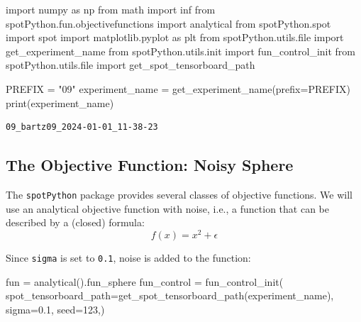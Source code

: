 \documentclass[
  letterpaper,
  DIV=11,
  numbers=noendperiod]{scrreprt}
\newenvironment{Shaded}{\begin{snugshade}}{\end{snugshade}}
\newcommand{\BuiltInTok}[1]{\textcolor[rgb]{0.00,0.23,0.31}{#1}}
\newcommand{\DecValTok}[1]{\textcolor[rgb]{0.68,0.00,0.00}{#1}}
\newcommand{\FloatTok}[1]{\textcolor[rgb]{0.68,0.00,0.00}{#1}}
\newcommand{\ImportTok}[1]{\textcolor[rgb]{0.00,0.46,0.62}{#1}}
\newcommand{\NormalTok}[1]{\textcolor[rgb]{0.00,0.23,0.31}{#1}}
\newcommand{\OperatorTok}[1]{\textcolor[rgb]{0.37,0.37,0.37}{#1}}
\newcommand{\StringTok}[1]{\textcolor[rgb]{0.13,0.47,0.30}{#1}}
\begin{document}
\begin{Shaded}
\begin{Highlighting}[]
\ImportTok{import}\NormalTok{ numpy }\ImportTok{as}\NormalTok{ np}
\ImportTok{from}\NormalTok{ math }\ImportTok{import}\NormalTok{ inf}
\ImportTok{from}\NormalTok{ spotPython.fun.objectivefunctions }\ImportTok{import}\NormalTok{ analytical}
\ImportTok{from}\NormalTok{ spotPython.spot }\ImportTok{import}\NormalTok{ spot}
\ImportTok{import}\NormalTok{ matplotlib.pyplot }\ImportTok{as}\NormalTok{ plt}
\ImportTok{from}\NormalTok{ spotPython.utils.}\BuiltInTok{file} \ImportTok{import}\NormalTok{ get\_experiment\_name}
\ImportTok{from}\NormalTok{ spotPython.utils.init }\ImportTok{import}\NormalTok{ fun\_control\_init}
\ImportTok{from}\NormalTok{ spotPython.utils.}\BuiltInTok{file} \ImportTok{import}\NormalTok{ get\_spot\_tensorboard\_path}

\NormalTok{PREFIX }\OperatorTok{=} \StringTok{"09"}
\NormalTok{experiment\_name }\OperatorTok{=}\NormalTok{ get\_experiment\_name(prefix}\OperatorTok{=}\NormalTok{PREFIX)}
\BuiltInTok{print}\NormalTok{(experiment\_name)}
\end{Highlighting}
\end{Shaded}

\begin{verbatim}
09_bartz09_2024-01-01_11-38-23
\end{verbatim}

\hypertarget{the-objective-function-noisy-sphere-1}{%
\subsection{The Objective Function: Noisy
Sphere}\label{the-objective-function-noisy-sphere-1}}

The \texttt{spotPython} package provides several classes of objective
functions. We will use an analytical objective function with noise,
i.e., a function that can be described by a (closed) formula:
\[f(x) = x^2 + \epsilon\]

Since \texttt{sigma} is set to \texttt{0.1}, noise is added to the
function:

\begin{Shaded}
\begin{Highlighting}[]
\NormalTok{fun }\OperatorTok{=}\NormalTok{ analytical().fun\_sphere}
\NormalTok{fun\_control }\OperatorTok{=}\NormalTok{ fun\_control\_init(}
\NormalTok{    spot\_tensorboard\_path}\OperatorTok{=}\NormalTok{get\_spot\_tensorboard\_path(experiment\_name),}
\NormalTok{    sigma}\OperatorTok{=}\FloatTok{0.1}\NormalTok{,}
\NormalTok{    seed}\OperatorTok{=}\DecValTok{123}\NormalTok{,)}
\end{Highlighting}
\end{Shaded}
\end{document}
